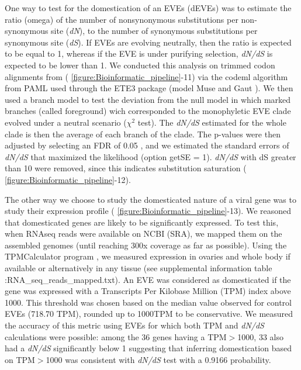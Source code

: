 One way to test for the domestication of an EVEs (dEVEs) was to estimate the ratio (omega) of the number of nonsynonymous substitutions per non-synonymous site (\textit{dN}), to the number of synonymous substitutions per synonymous site (\textit{dS}). If EVEs are evolving neutrally, then the ratio is expected to be equal to 1, whereas if the EVE is under purifying selection, \textit{dN/dS} is expected to be lower than 1. We conducted this analysis on trimmed codon alignments from (\figurename{ \ref{figure:Bioinformatic_pipeline}}-11) via the codeml algorithm from PAML \citep{yang_paml_2007} used through the ETE3 package \citep{huerta-cepas_ete_2016}  (model Muse and Gaut  \citep{muse_likelihood_1994}). We then used a branch model to test the deviation from the null model in which marked branches (called foreground) wich corresponded to the monophyletic EVE clade evolved under a neutral scenario ($\chi^2$ test). The \textit{dN/dS} estimated for the whole clade is then the average of each branch of the clade. The p-values were then adjusted by selecting an FDR of 0.05 \citep{puolivali_influence_2020}, and we estimated the standard errors of \textit{dN/dS} that maximized the likelihood (option getSE = 1). \textit{dN/dS} with dS greater than 10 were removed, since this indicates substitution saturation (\figurename{ \ref{figure:Bioinformatic_pipeline}}-12). 

The other way we choose to study the domesticated nature of a viral gene was to study their expression profile (\figurename{ \ref{figure:Bioinformatic_pipeline}}-13). We reasoned that domesticated genes are likely to be significantly expressed.  To test this, when RNAseq reads were available on NCBI (SRA), we mapped them on the assembled genomes (until reaching 300x coverage as far as possible). Using the TPMCalculator program \citep{vera_alvarez_tpmcalculator_2019}, we measured expression in ovaries and whole body if available or alternatively in any tissue (see supplemental information table :RNA\_seq\_reads\_mapped.txt). An EVE was considered as domesticated if the gene was expressed with a Transcripts Per Kilobase Million (TPM) index above 1000. This threshold was chosen based on the median value observed for control EVEs (718.70 TPM), rounded up to 1000TPM to be conservative. We measured the accuracy of this metric using EVEs for which both TPM and \textit{dN/dS} calculations were possible: among the 36 genes having a TPM$>$1000, 33 also had a \textit{dN/dS} significantly below 1 suggesting that inferring domestication based on TPM$>$1000 was consistent with \textit{dN/dS} test with a  0.9166 probability.

